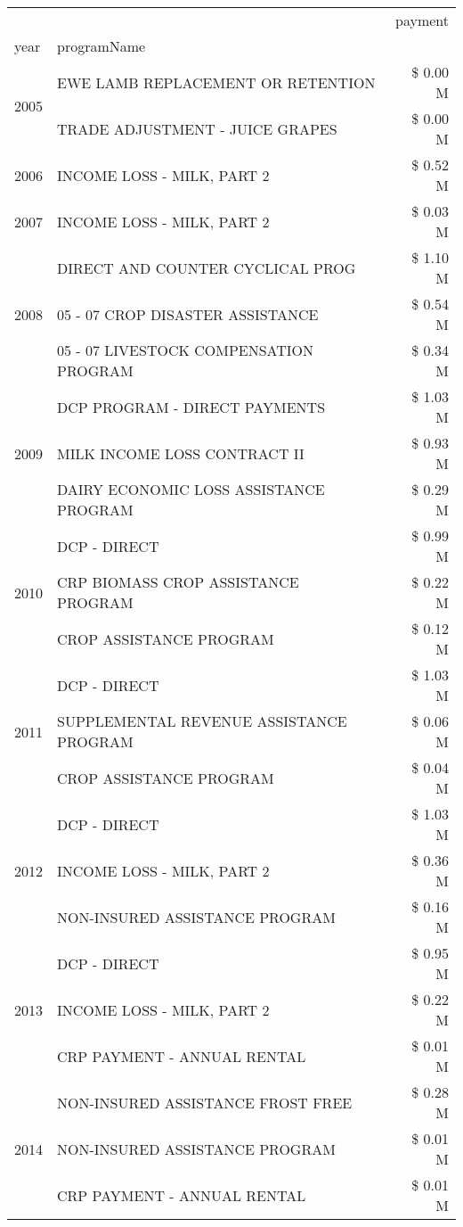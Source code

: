 \begin{tabular}{llr}
\toprule
 &  & payment \\
year & programName &  \\
\midrule
\multirow[t]{2}{*}{2005} & EWE LAMB REPLACEMENT OR RETENTION & \$ 0.00 M \\
 & TRADE ADJUSTMENT - JUICE GRAPES & \$ 0.00 M \\
\cline{1-3}
2006 & INCOME LOSS - MILK, PART 2 & \$ 0.52 M \\
\cline{1-3}
2007 & INCOME LOSS - MILK, PART 2 & \$ 0.03 M \\
\cline{1-3}
\multirow[t]{3}{*}{2008} & DIRECT AND COUNTER CYCLICAL PROG & \$ 1.10 M \\
 & 05 - 07 CROP DISASTER ASSISTANCE & \$ 0.54 M \\
 & 05 - 07 LIVESTOCK COMPENSATION PROGRAM & \$ 0.34 M \\
\cline{1-3}
\multirow[t]{3}{*}{2009} & DCP PROGRAM - DIRECT PAYMENTS & \$ 1.03 M \\
 & MILK INCOME LOSS CONTRACT II & \$ 0.93 M \\
 & DAIRY ECONOMIC LOSS ASSISTANCE PROGRAM & \$ 0.29 M \\
\cline{1-3}
\multirow[t]{3}{*}{2010} & DCP - DIRECT & \$ 0.99 M \\
 & CRP BIOMASS CROP ASSISTANCE PROGRAM & \$ 0.22 M \\
 & CROP ASSISTANCE PROGRAM & \$ 0.12 M \\
\cline{1-3}
\multirow[t]{3}{*}{2011} & DCP - DIRECT & \$ 1.03 M \\
 & SUPPLEMENTAL REVENUE ASSISTANCE PROGRAM & \$ 0.06 M \\
 & CROP ASSISTANCE PROGRAM & \$ 0.04 M \\
\cline{1-3}
\multirow[t]{3}{*}{2012} & DCP - DIRECT & \$ 1.03 M \\
 & INCOME LOSS - MILK, PART 2 & \$ 0.36 M \\
 & NON-INSURED ASSISTANCE PROGRAM & \$ 0.16 M \\
\cline{1-3}
\multirow[t]{3}{*}{2013} & DCP - DIRECT & \$ 0.95 M \\
 & INCOME LOSS - MILK, PART 2 & \$ 0.22 M \\
 & CRP PAYMENT - ANNUAL RENTAL & \$ 0.01 M \\
\cline{1-3}
\multirow[t]{3}{*}{2014} & NON-INSURED ASSISTANCE FROST FREE & \$ 0.28 M \\
 & NON-INSURED ASSISTANCE PROGRAM & \$ 0.01 M \\
 & CRP PAYMENT - ANNUAL RENTAL & \$ 0.01 M \\

\end{tabular}
